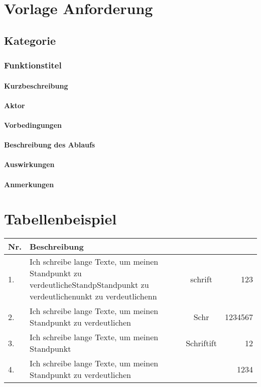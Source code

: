 \documentclass[10pt,a4paper]{article}
\begin{document}
    \section{Vorlage Anforderung}
    \subsection{Kategorie}
    \subsubsection{\textbf{Funktionstitel}}
    \paragraph{Kurzbeschreibung}
    \paragraph{Aktor}
    \paragraph{Vorbedingungen}
    \paragraph{Beschreibung des Ablaufs}
    \paragraph{Auswirkungen}
    \paragraph{Anmerkungen}

    \section{Tabellenbeispiel}
    \begin{tabularx}{\textwidth}{|l|X|c|r|}
        \hline
        \textbf{Nr.} & \textbf{Beschreibung} & &\\
        \hline
        1. & Ich schreibe lange Texte, um meinen Standpunkt zu verdeutlicheStandpStandpunkt zu verdeutlichenunkt zu verdeutlichenn  & schrift  &  123 \\
        \hline
        2. & Ich schreibe lange Texte, um meinen Standpunkt zu verdeutlichen  & Schr  &   1234567 \\
        \hline
        3. & Ich schreibe lange Texte, um meinen Standpunkt   & Schriftift  &   12 \\
        \hline
        4. & Ich schreibe lange Texte, um meinen Standpunkt zu verdeutlichen  &   &   1234 \\
        \hline
    \end{tabularx}
\end{document}

